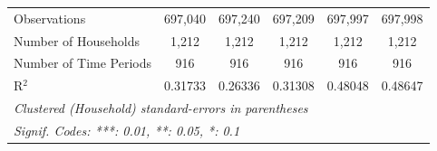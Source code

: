 \begin{table}[htbp]
\begin{tabular}{lccccc}
      Observations                                 & 697,040       & 697,240        & 697,209       & 697,997         & 697,998\\  
      Number of Households               & 1,212         & 1,212          & 1,212         & 1,212           & 1,212\\  
      Number of Time Periods                       & 916           & 916            & 916           & 916             & 916\\  
      R$^2$                                        & 0.31733       & 0.26336        & 0.31308       & 0.48048         & 0.48647\\  
      \midrule \midrule
      \multicolumn{6}{l}{\emph{Clustered (Household) standard-errors in parentheses}}\\
      \multicolumn{6}{l}{\emph{Signif. Codes: ***: 0.01, **: 0.05, *: 0.1}}\\
   \end{tabular}
\end{table}


